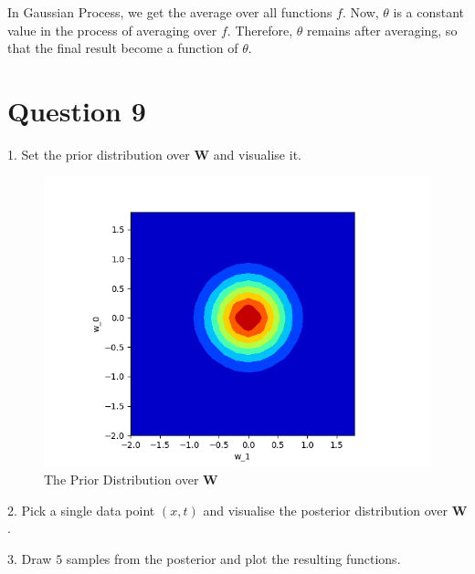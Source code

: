 \documentclass[12pt,letterpaper]{article}
\begin{document}
In Gaussian Process, we get the average over all functions $f$.
Now, $\theta$ is a constant value in the process of averaging over $f$.
Therefore, $\theta$ remains after averaging,
so that the final result become a function of $\theta$.



\section*{Question 9}
1. Set the prior distribution over $\textbf{W}$ and visualise it.


\begin{figure}[htb]
\centering
\includegraphics[scale =0.5]{Q9_01.png} 
\caption{The Prior Distribution over \textbf{W}}
\end{figure}

2. Pick a single data point $(x,t)$ and visualise the posterior distribution over $\textbf{W}$.

3. Draw $5$ samples from the posterior and plot the resulting functions.
\end{document}
